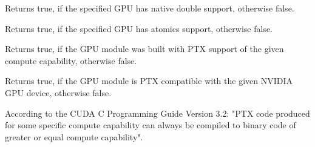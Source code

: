 Returns true, if the specified GPU has native double support, otherwise false.

\begin{description}
\end{description}


Returns true, if the specified GPU has atomics support, otherwise false.

\begin{description}
\end{description} 


Returns true, if the GPU module was built with PTX support of the given compute capability, otherwise false.

\begin{description}
\end{description}


Returns true, if the GPU module is PTX compatible with the given NVIDIA GPU device, otherwise false.

\begin{description}
\end{description}

According to the CUDA C Programming Guide Version 3.2: "PTX code produced for some specific compute capability can always be compiled to binary code of greater or equal compute capability". 

